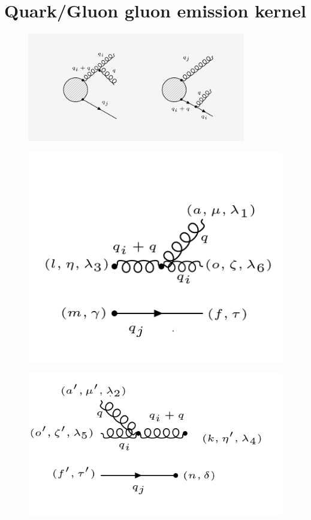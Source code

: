 \section{Quark/Gluon gluon emission kernel}

\begin{figure}[ht!]
\centering
\includegraphics[width=0.85\textwidth]{images/ggq-diagrams.png}
\end{figure}

\begin{figure}[ht!]
\centering
\includegraphics[scale=0.7]{images/ggqM1.png}
\end{figure}

\begin{figure}[ht!]
\centering
\includegraphics[scale=0.7]{images/ggqM1dagger.png}
\end{figure}

